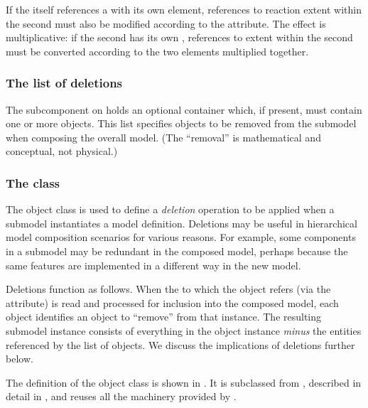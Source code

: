 If the \Submodel itself references a \Model with its own \Submodel element, references to reaction extent within the second \Submodel must also be modified according to the  attribute.  The effect is multiplicative: if the second \Submodel has its own , references to extent within the second \Submodel must be converted according to the two  elements multiplied together.


\subsubsection{The list of deletions}
\label{listofdeletions}

The  subcomponent on \Submodel holds an optional \ListOfDeletions container which, if present, must contain one or more \Deletion objects.  This list specifies objects to be removed from the submodel when composing the overall model.  (The ``removal'' is mathematical and conceptual, not physical.)


\subsubsection{The  class}
\label{deletion-class}

The \Deletion object class is used to define a \emph{deletion} operation to be applied when a submodel instantiates a model definition. Deletions may be useful in hierarchical model composition scenarios for various reasons.  For example, some components in a submodel may be redundant in the composed model, perhaps because the same features are implemented in a different way in the new model.

Deletions function as follows.  When the \Model to which the \Submodel object refers (via the  attribute) is read and processed for inclusion into the composed model, each \Deletion object identifies an object to ``remove'' from that \Model instance.  The resulting submodel instance consists of everything in the \Model object instance \emph{minus} the entities referenced by the list of \Deletion objects. We discuss the implications of deletions further below.

The definition of the \Deletion object class is shown in .  It is subclassed from \SBaseRef, described in detail in , and reuses all the machinery provided by \SBaseRef.



